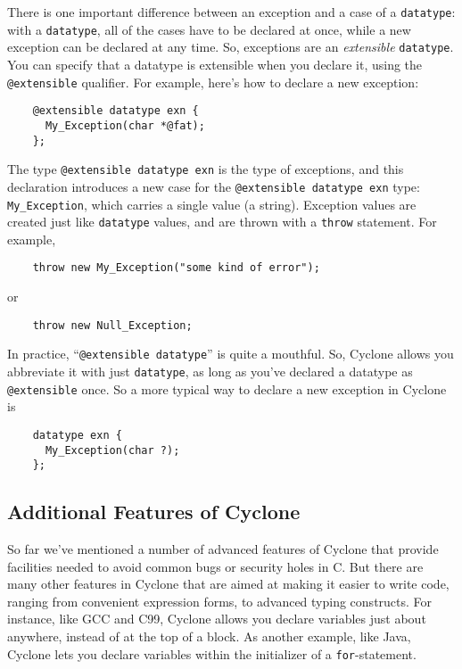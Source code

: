 There is one important difference between an exception and a case of a
\texttt{datatype}: with a \texttt{datatype}, all of the cases have to be
declared at once, while a new exception can be declared at any time.
So, exceptions are an \emph{extensible} \texttt{datatype}.  You can
specify that a datatype is extensible when you declare it, using the
\texttt{@extensible} qualifier.  For example, 
here's how to declare a new exception:
\begin{verbatim}
    @extensible datatype exn {
      My_Exception(char *@fat);
    };
\end{verbatim}
The type \texttt{@extensible datatype exn} is the type of exceptions,
and this declaration introduces a new case for the \texttt{@extensible
datatype exn} type: \texttt{My_Exception}, which carries a single
value (a string).  Exception values are created just like
\texttt{datatype} values, and are thrown with a \texttt{throw}
statement.  For example,
\begin{verbatim}
    throw new My_Exception("some kind of error");
\end{verbatim}
or
\begin{verbatim}
    throw new Null_Exception;
\end{verbatim}

In practice, ``\texttt{@extensible datatype}'' is quite a mouthful.
So, Cyclone allows you abbreviate it with just \texttt{datatype},
as long as you've declared a datatype as \texttt{@extensible} once.
So a more typical way to declare a new exception in Cyclone is
\begin{verbatim}
    datatype exn {
      My_Exception(char ?);
    };
\end{verbatim}

\subsection{Additional Features of Cyclone}

So far we've mentioned a number of advanced features of
Cyclone that provide facilities needed to avoid common bugs
or security holes in C.  
But there are many other features in Cyclone that are
aimed at making it easier to write code, ranging from convenient
expression forms, to advanced typing constructs.  For instance,
like GCC and C99, Cyclone allows you declare variables just
about anywhere, instead of at the top of a block.  As another
example, like Java, Cyclone lets you declare variables within
the initializer of a \texttt{for}-statement.  

